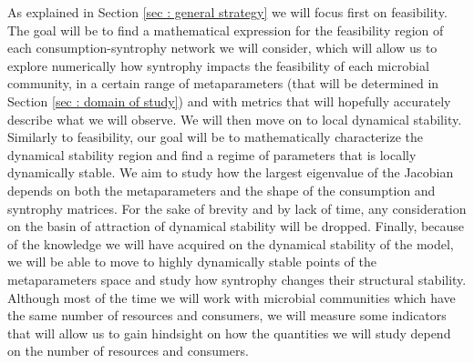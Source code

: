 \documentclass[12pt, titlepage]{report}
\begin{document}
As explained in Section \ref{sec : general strategy} we will focus first on feasibility. The goal will be to find a mathematical expression for the feasibility region of each consumption-syntrophy network we will consider, which will allow us to explore numerically how syntrophy impacts the feasibility of each microbial community, in a certain range of metaparameters (that will be determined in Section \ref{sec : domain of study}) and with metrics that will hopefully accurately describe what we will observe. We will then move on to local dynamical stability. Similarly to feasibility, our goal will be to mathematically characterize the dynamical stability region and find a regime of parameters that is locally dynamically stable. We aim to study how the largest eigenvalue of the Jacobian depends on both the metaparameters and the shape of the consumption and syntrophy matrices. For the sake of brevity and by lack of time, any consideration on the basin of attraction of dynamical stability will be dropped. Finally, because of the knowledge we will have acquired on the dynamical stability of the model, we will be able to move to highly dynamically stable points of the metaparameters space and study how syntrophy changes their structural stability. Although most of the time we will work with microbial communities which have the same number of resources and consumers, we will measure some indicators that will allow us to gain hindsight on how the quantities we will study depend on the number of resources and consumers.
\end{document}

